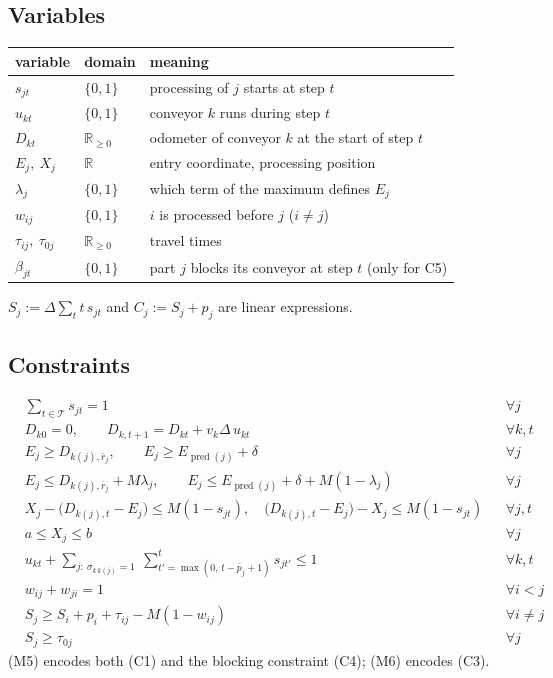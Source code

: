 \documentclass[11pt,a4paper]{article}
\theoremstyle{definition}
\theoremstyle{remark}
\newcommand{\pred}{\operatorname{pred}}
\newcommand{\R}{\mathbb{R}}
\begin{document}
\subsection{Variables}
\begin{center}
\begin{tabular}{@{}lll@{}}
\toprule
variable & domain & meaning\\
\midrule
$s_{jt}$ & $\{0,1\}$ & processing of $j$ starts at step $t$\\
$u_{kt}$ & $\{0,1\}$ & conveyor $k$ runs during step $t$\\
$D_{kt}$ & $\R_{\ge0}$ & odometer of conveyor $k$ at the start of step $t$\\
$E_j,\ X_j$ & $\R$ & entry coordinate, processing position\\
$\lambda_j$ & $\{0,1\}$ & which term of the maximum defines $E_j$\\
$w_{ij}$ & $\{0,1\}$ & $i$ is processed before $j$ ($i\neq j$)\\
$\tau_{ij},\ \tau_{0j}$ & $\R_{\ge0}$ & travel times\\
$\beta_{jt}$ & $\{0,1\}$ & part $j$ blocks its conveyor at step $t$ (only for C5)\\
\bottomrule
\end{tabular}
\end{center}
$S_j:=\Delta\sum_t t\,s_{jt}$ and $C_j:=S_j+p_j$ are linear expressions.

\subsection{Constraints}
\begin{align}
&\textstyle\sum_{t\in\mathcal T}s_{jt}=1 && \forall j \tag{M1}\\
&D_{k0}=0,\qquad D_{k,t+1}=D_{kt}+v_k\Delta\,u_{kt} && \forall k,t \tag{M2}\\
&E_j\ge D_{k(j),\bar r_j},\qquad E_j\ge E_{\pred(j)}+\delta && \forall j \tag{M3a}\\
&E_j\le D_{k(j),\bar r_j}+M\lambda_j,\qquad E_j\le E_{\pred(j)}+\delta+M(1-\lambda_j) && \forall j \tag{M3b}\\
&X_j-\bigl(D_{k(j),t}-E_j\bigr)\le M(1-s_{jt}),\quad
 \bigl(D_{k(j),t}-E_j\bigr)-X_j\le M(1-s_{jt}) && \forall j,t \tag{M4}\\
&a\le X_j\le b && \forall j \tag{M5}\\
&u_{kt}+\sum_{j:\ \sigma_{k\,k(j)}=1}\ \sum_{t'=\max(0,\,t-\bar p_j+1)}^{t}s_{jt'}\le 1 && \forall k,t \tag{M6}\\
&w_{ij}+w_{ji}=1 && \forall i<j \tag{M7}\\
&S_j\ge S_i+p_i+\tau_{ij}-M(1-w_{ij}) && \forall i\neq j \tag{M8}\\
&S_j\ge\tau_{0j} && \forall j \tag{M9}
\end{align}
(M5) encodes both (C1) and the blocking constraint (C4); (M6) encodes (C3).
\end{document}
